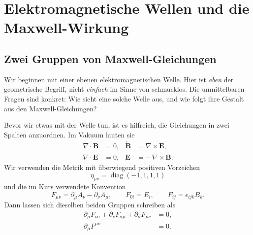 \chapter{Elektromagnetische Wellen und die Maxwell-Wirkung}


\section{Zwei Gruppen von Maxwell-Gleichungen}

Wir beginnen mit einer ebenen elektromagnetischen Welle. Hier ist \emph{eben} der geometrische Begriff, nicht \emph{einfach} im Sinne von schmucklos. Die unmittelbaren Fragen sind konkret: Wie sieht eine solche Welle aus, und wie folgt ihre Gestalt aus den Maxwell-Gleichungen?

Bevor wir etwas mit der Welle tun, ist es hilfreich, die Gleichungen in zwei Spalten anzuordnen. Im Vakuum lauten sie
\begin{align}
\nabla\cdot\mathbf B&=0,
&
\dot{\mathbf B}&=\nabla\times\mathbf E,
\label{eq:homogeneous-vector}
\\
\nabla\cdot\mathbf E&=0,
&
\dot{\mathbf E}&=-\,\nabla\times\mathbf B.
\label{eq:dynamical-vector-vacuum}
\end{align}
Wir verwenden die Metrik mit überwiegend positiven Vorzeichen
\begin{equation}
\eta_{\mu\nu}=\operatorname{diag}(-1,1,1,1)
\end{equation}
und die im Kurs verwendete Konvention
\begin{equation}
F_{\mu\nu}
=
\partial_\mu A_\nu-\partial_\nu A_\mu,
\qquad
F_{0i}=E_i,
\qquad
F_{ij}=\epsilon_{ijk}B_k.
\label{eq:course-f-convention}
\end{equation}
Dann lassen sich dieselben beiden Gruppen schreiben als
\begin{align}
\partial_\mu F_{\nu\sigma}
+\partial_\nu F_{\sigma\mu}
+\partial_\sigma F_{\mu\nu}
&=0,
\label{eq:bianchi-l9}
\\
\partial_\mu F^{\mu\nu}
&=0.
\label{eq:vacuum-maxwell-covariant}
\end{align}

